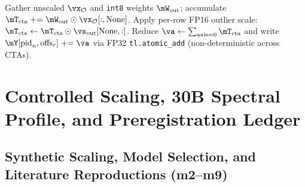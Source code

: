 \documentclass[10pt]{article} %
\begin{document}
\begin{algorithm}[htbp]
\begin{algorithmic}[1]
        \State Gather unscaled $\vx_{\mathcal{O}}$ and \texttt{int8} weights $\mW_{\text{out}}$; accumulate $\mT_{\text{cta}} \mathrel{+}= \mW_{\text{out}} \odot \vx_{\mathcal{O}}[:,\mathrm{None}]$.
    \EndFor
    \State Apply per-row FP16 outlier scale: $\mT_{\text{cta}} \gets \mT_{\text{cta}} \odot \vs_{\text{out}}[\mathrm{None},:]$.
\EndIf
\State Reduce $\va \gets \sum_{\text{axis}=0} \mT_{\text{cta}}$ and write $\mY[\text{pid}_n, \text{offs}_r] \mathrel{+}= \va$ via FP32 \texttt{tl.atomic\_add} (non-deterministic across CTAs).
\end{algorithmic}
\end{algorithm}

\clearpage
\section{Controlled Scaling, 30B Spectral Profile, and Preregistration Ledger}
\label{app:controlled}

\subsection{Synthetic Scaling, Model Selection, and Literature Reproductions (m2--m9)}
\end{document}
